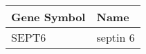 \begin{tabular}{ll}
\toprule
Gene Symbol &     Name \\
\midrule
      SEPT6 & septin 6 \\
\bottomrule
\end{tabular}
